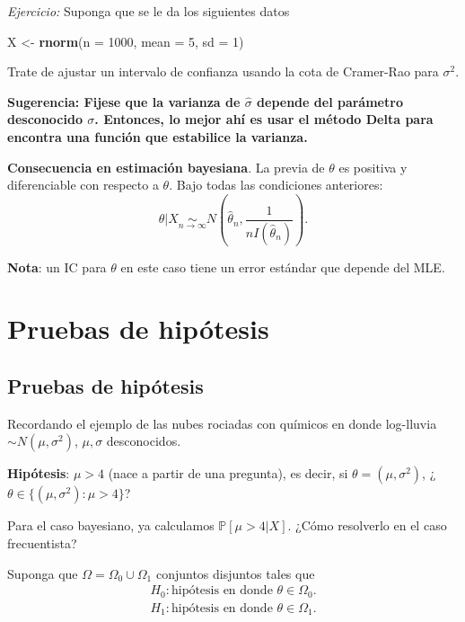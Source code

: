 \documentclass[
  12pt,
]{book}
\newenvironment{Shaded}{\begin{snugshade}}{\end{snugshade}}
\newcommand{\DataTypeTok}[1]{\textcolor[rgb]{0.13,0.29,0.53}{#1}}
\newcommand{\DecValTok}[1]{\textcolor[rgb]{0.00,0.00,0.81}{#1}}
\newcommand{\KeywordTok}[1]{\textcolor[rgb]{0.13,0.29,0.53}{\textbf{#1}}}
\newcommand{\NormalTok}[1]{#1}
\newcommand{\StringTok}[1]{\textcolor[rgb]{0.31,0.60,0.02}{#1}}
\begin{document}
\emph{Ejercicio:} Suponga que se le da los siguientes datos

\begin{Shaded}
\begin{Highlighting}[]
\NormalTok{X \textless{}{-}}\StringTok{ }\KeywordTok{rnorm}\NormalTok{(}\DataTypeTok{n =} \DecValTok{1000}\NormalTok{, }\DataTypeTok{mean =} \DecValTok{5}\NormalTok{, }\DataTypeTok{sd =} \DecValTok{1}\NormalTok{)}
\end{Highlighting}
\end{Shaded}

Trate de ajustar un intervalo de confianza usando la cota de Cramer-Rao para \(\sigma^2\).

\textbf{Sugerencia: Fijese que la varianza de \(\hat\sigma\) depende del parámetro
desconocido \(\sigma\). Entonces, lo mejor ahí es usar el método Delta para
encontra una función que estabilice la varianza. }

\textbf{Consecuencia en estimación bayesiana}. La previa de \(\theta\) es positiva y diferenciable con respecto a \(\theta\). Bajo todas las condiciones anteriores:
\[\theta|X\underset{n\to\infty}{\sim} N\left(\hat\theta_n,\dfrac 1{nI(\hat\theta_n)}\right).\]

\textbf{Nota}: un IC para \(\theta\) en este caso tiene un error estándar que depende del MLE.

\hypertarget{pruebas-de-hipuxf3tesis}{%
\chapter{Pruebas de hipótesis}\label{pruebas-de-hipuxf3tesis}}

\hypertarget{pruebas-de-hipuxf3tesis-1}{%
\section{Pruebas de hipótesis}\label{pruebas-de-hipuxf3tesis-1}}

Recordando el ejemplo de las nubes rociadas con químicos en donde log-lluvia \(\sim N(\mu,\sigma^2)\), \(\mu,\sigma\) desconocidos.

\textbf{Hipótesis}: \(\mu>4\) (nace a partir de una pregunta), es decir, si \(\theta = (\mu,\sigma^2)\), ¿\(\theta\in\{(\mu,\sigma^2): \mu>4\}\)?

Para el caso bayesiano, ya calculamos \(\mathbb P[\mu>4|X]\). ¿Cómo resolverlo en el caso frecuentista?

Suponga que \(\Omega = \Omega_0 \cup\Omega_1\) conjuntos disjuntos tales que
\begin{align*}
H_0 :  \text{hipótesis en donde }\theta \in \Omega_0.\\
H_1 : \text{hipótesis en donde }\theta \in \Omega_1.\\
\end{align*}
\end{document}
